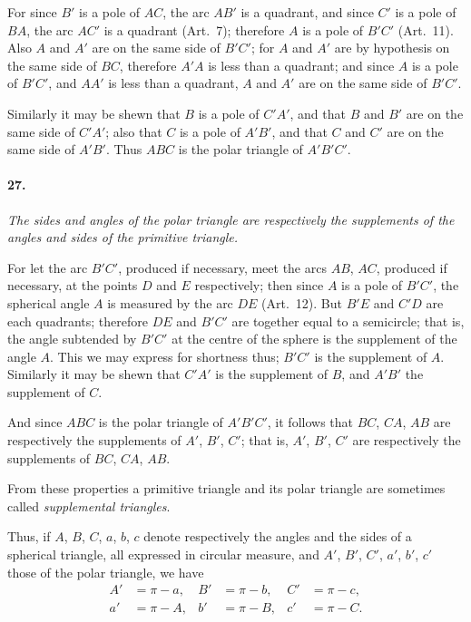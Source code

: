\documentclass{book}[2004/02/16]
\begin{document}
\begin{mainmatter}
\begin{spacing}{1.3}
For since $B'$ is a pole of $AC$, the arc $AB'$ is a quadrant, and
since $C'$ is a pole of $BA$, the arc $AC'$ is a quadrant (Art.\ 7); therefore
$A$ is a pole of $B'C'$ (Art.\ 11). Also $A$ and $A'$ are on the same
side of $B'C'$; for $A$ and $A'$ are by hypothesis on the same side of
$BC$, therefore $A'A$ is less than a quadrant; and since $A$ is a pole
of $B'C'$, and $AA'$ is less than a quadrant, $A$ and $A'$ are on the
same side of $B'C'$.

Similarly it may be shewn that $B$ is a pole of $C'A'$, and that $B$
and $B'$ are on the same side of $C'A'$; also that $C$ is a pole of $A'B'$,
and that $C$ and $C'$ are on the same side of $A'B'$. Thus $ABC$ is the
polar triangle of $A'B'C'$.

\paragraph{27.} \textit{The sides and angles of the polar triangle are respectively
the supplements of the angles and sides of the primitive triangle.}

For let the arc $B'C'$, produced if necessary, meet the arcs $AB$,
$AC$, produced if necessary, at the points $D$ and $E$ respectively;
then since $A$ is a pole of $B'C'$, the spherical angle $A$ is measured by
the arc $DE$ (Art.\ 12). But $B'E$ and $C'D$ are each quadrants;
therefore $DE$ and $B'C'$ are together equal to a semicircle; that is,
the angle subtended by $B'C'$ at the centre of the sphere is the
supplement of the angle $A$. This we may express for shortness
thus; $B'C'$ is the supplement of $A$. Similarly it may be shewn
that $C'A'$ is the supplement of $B$, and $A'B'$ the supplement of $C$.

And since $ABC$ is the polar triangle of $A'B'C'$, it follows that
$BC$, $CA$, $AB$ are respectively the supplements of $A'$, $B'$, $C'$; that
is, $A'$, $B'$, $C'$ are respectively the supplements of $BC$, $CA$, $AB$.

From these properties a primitive triangle and its polar triangle
are sometimes called \textit{supplemental triangles}.

Thus, if $A$, $B$, $C$, $a$, $b$, $c$ denote respectively the angles and
the sides of a spherical triangle, all expressed in circular measure,
and $A'$, $B'$, $C'$, $a'$, $b'$, $c'$ those of the polar triangle, we have
\begin{align*}
A' &= \pi - a,& B' &= \pi - b,& C' &= \pi - c,\\
a' &= \pi - A,& b' &= \pi - B,& c' &= \pi - C.
\end{align*}


\end{spacing}
\end{mainmatter}
\end{document}
